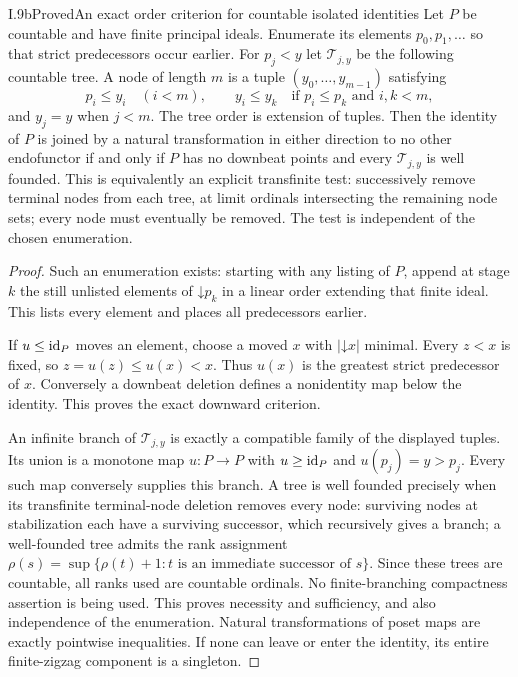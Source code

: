 \begin{claim}{I.9b}{Proved}{An exact order criterion for countable isolated identities}
Let $P$ be countable and have finite principal ideals. Enumerate its
elements $p_0,p_1,\ldots$ so that strict predecessors occur earlier.
For $p_j<y$ let $\mathcal T_{j,y}$ be the following countable tree.
A node of length $m$ is a tuple $(y_0,\ldots,y_{m-1})$ satisfying
\[
 p_i\leq y_i\quad(i<m),\qquad
 y_i\leq y_k\quad\text{if }p_i\leq p_k\text{ and }i,k<m,
\]
and $y_j=y$ when $j<m$. The tree order is extension of tuples.
Then the identity of $P$ is joined by a natural transformation in
either direction to no other endofunctor if and only if
$P$ has no downbeat points and every $\mathcal T_{j,y}$ is
well founded. This is equivalently an explicit transfinite test:
successively remove terminal nodes from each tree, at limit ordinals
intersecting the remaining node sets; every node must eventually be
removed. The test is independent of the chosen enumeration.
\end{claim}
\begin{proof}
Such an enumeration exists: starting with any listing of $P$, append
at stage $k$ the still unlisted elements of $\mathord\downarrow p_k$
in a linear order extending that finite ideal. This lists every
element and places all predecessors earlier.

If $u\leq\mathrm{id}_P$ moves an element, choose a moved $x$ with
$|\mathord\downarrow x|$ minimal. Every $z<x$ is fixed, so
$z=u(z)\leq u(x)<x$. Thus $u(x)$ is the greatest strict predecessor
of $x$. Conversely a downbeat deletion defines a nonidentity map
below the identity. This proves the exact downward criterion.

An infinite branch of $\mathcal T_{j,y}$ is exactly a compatible
family of the displayed tuples. Its union is a monotone map
$u:P\to P$ with $u\geq\mathrm{id}_P$ and $u(p_j)=y>p_j$.
Every such map conversely supplies this branch. A tree is well
founded precisely when its transfinite terminal-node deletion removes
every node: surviving nodes at stabilization each have a surviving
successor, which recursively gives a branch; a well-founded tree
admits the rank assignment
$\rho(s)=\sup\{\rho(t)+1:t\text{ is an immediate successor of }s\}$.
Since these trees are countable, all ranks used are countable
ordinals. No finite-branching compactness assertion is being used.
This proves necessity and sufficiency, and also independence of the
enumeration. Natural transformations of poset maps are exactly
pointwise inequalities. If none can leave or enter the identity,
its entire finite-zigzag component is a singleton.
\end{proof}

